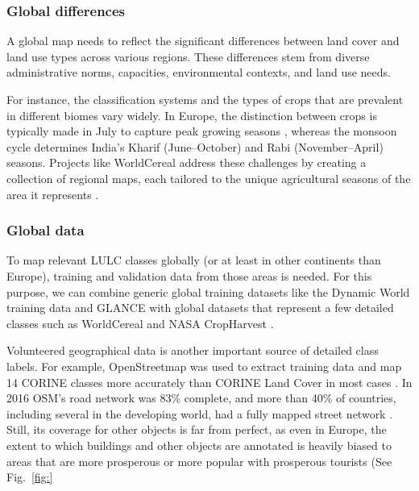         \subsubsection{Global differences}
        
            A global map needs to reflect the significant differences between land cover and land use types across various regions. These differences stem from diverse administrative norms, capacities, environmental contexts, and land use needs. 
            
            For instance, the classification systems and the types of crops that are prevalent in different biomes vary widely. In Europe, the distinction between crops is typically made in July to capture peak growing seasons \citep{esch2014differentiation,xu2021towards}, whereas the monsoon cycle determines India's Kharif (June--October) and Rabi (November--April) seasons.
            Projects like WorldCereal address these challenges by creating a collection of regional maps, each tailored to the unique agricultural seasons of the area it represents \citep{tricht2023worldcereal}.
            
        \subsubsection{Global data}
            \label{syn:everywhere-globaldata}

            To map relevant LULC classes globally (or at least in other continents than Europe), training and validation data from those areas is needed. For this purpose, we can combine generic global training datasets like the Dynamic World training data \citep{tait2021dwtd} and GLANCE \citep{stanimirova2023global} with global datasets that represent a few detailed classes such as WorldCereal \citep{boogaard2023worldcereal} and NASA CropHarvest \citep{tseng2021cropharvest}. 
            
            Volunteered geographical data is another important source of detailed class labels. For example, OpenStreetmap was used to extract training data and map 14 CORINE classes more accurately than CORINE Land Cover in most cases \citep{schultz2017open}. In 2016 OSM's road network was 83\% complete, and more than 40\% of countries, including several in the developing world, had a fully mapped street network \citep{barrington2017world}. Still, its coverage for other objects is far from perfect, as even in Europe, the extent to which buildings and other objects are annotated is heavily biased to areas that are more prosperous or more popular with prosperous tourists (See Fig.\@~\ref{fig:}

